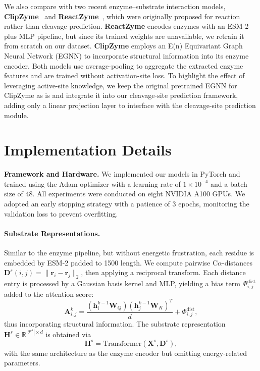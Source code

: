 We also compare with two recent enzyme–substrate interaction models, \textbf{ClipZyme}~\cite{ClipZyme} and \textbf{ReactZyme}~\cite{ReactZyme}, which were originally proposed for reaction rather than cleavage prediction. \textbf{ReactZyme} encodes enzymes with an ESM-2 plus MLP pipeline, but since its trained weights are unavailable, we retrain it from scratch on our dataset. \textbf{ClipZyme} employs an E(n) Equivariant Graph Neural Network (EGNN) to incorporate structural information into its enzyme encoder. Both models use average-pooling to aggregate the extracted enzyme features and are trained without activation-site loss. To highlight the effect of leveraging active-site knowledge, we keep the original pretrained EGNN for ClipZyme as is and integrate it into our cleavage-site prediction framework, adding only a linear projection layer to interface with the cleavage-site prediction module.






\section{Implementation Details}
\label{sec:app_imp}

\textbf{Framework and Hardware.} We implemented our models in PyTorch and trained using the Adam optimizer with a learning rate of \(1\times10^{-4}\) and a batch size of 48. All experiments were conducted on eight NVIDIA A100 GPUs. We adopted an early stopping strategy with a patience of 3 epochs, monitoring the validation loss to prevent overfitting.



\paragraph{Substrate Representations.}
\label{sec:Substrate Encoding Details}
Similar to the enzyme pipeline, but without energetic frustration, each residue is embedded by ESM-2 padded to 1500 length. We compute pairwise C$\alpha$-distances $\mathbf{D}^s(i,j) = \|\mathbf{r}_i - \mathbf{r}_j\|_2$, then applying a reciprocal transform. Each distance entry is processed by a Gaussian basis kernel and MLP, yielding a bias term $\Phi_{i,j}^{\mathrm{dist}}$ added to the attention score:
\begin{equation}
    \mathbf{A}_{i,j}^{k} 
    = 
    \frac{(\mathbf{h}_i^{k-1} \mathbf{W}_Q)
          (\mathbf{h}_j^{k-1} \mathbf{W}_K)^T}{d}
    + 
    \Phi_{i,j}^{\mathrm{dist}},
\end{equation}
thus incorporating structural information. The substrate representation $\mathbf{H}^s \in \mathbb{R}^{|\mathcal{P}^s| \times d}$ is obtained via
\begin{equation}
    \mathbf{H}^s = \mathrm{Transformer}(\mathbf{X}^s, \mathbf{D}^s),
\end{equation}
with the same architecture as the enzyme encoder but omitting energy-related parameters.











